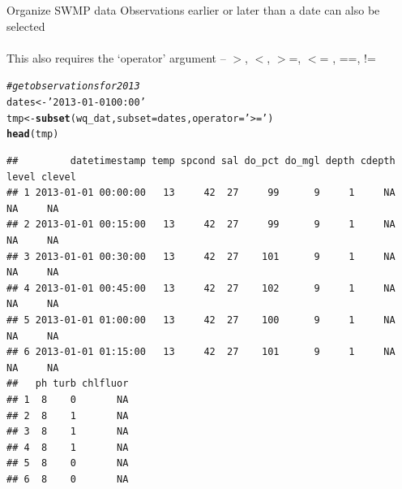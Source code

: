 \documentclass[xcolor=svgnames]{beamer}\usepackage[]{graphicx}\usepackage[]{color}
\makeatletter
\newcommand{\hlstr}[1]{\textcolor[rgb]{0.192,0.494,0.8}{#1}}%
\newcommand{\hlcom}[1]{\textcolor[rgb]{0.678,0.584,0.686}{\textit{#1}}}%
\newcommand{\hlstd}[1]{\textcolor[rgb]{0.345,0.345,0.345}{#1}}%
\newcommand{\hlkwb}[1]{\textcolor[rgb]{0.69,0.353,0.396}{#1}}%
\newcommand{\hlkwc}[1]{\textcolor[rgb]{0.333,0.667,0.333}{#1}}%
\newcommand{\hlkwd}[1]{\textcolor[rgb]{0.737,0.353,0.396}{\textbf{#1}}}%
\newenvironment{kframe}{%
 \def\at@end@of@kframe{}%
 \ifinner\ifhmode%
  \def\at@end@of@kframe{\end{minipage}}%
  \begin{minipage}{\columnwidth}%
 \fi\fi%
 \def\FrameCommand##1{\hskip\@totalleftmargin \hskip-\fboxsep
 \colorbox{shadecolor}{##1}\hskip-\fboxsep
     \hskip-\linewidth \hskip-\@totalleftmargin \hskip\columnwidth}%
 \MakeFramed {\advance\hsize-\width
   \@totalleftmargin\z@ \linewidth\hsize
   \@setminipage}}%
 {\par\unskip\endMakeFramed%
 \at@end@of@kframe}
\newenvironment{knitrout}{}{} %
\makeatother
\begin{document}
\begin{frame}[containsverbatim]{Organize SWMP data}
Observations earlier or later than a date can also be selected \\~\\
This also requires the `operator' argument -- $>$, $<$, $>$=, $<$= , ==, !=
\begin{knitrout}\scriptsize
{}\color{fgcolor}\begin{kframe}
\begin{alltt}
\hlcom{# get observations for 2013}
\hlstd{dates} \hlkwb{<-} \hlstr{'2013-01-01 00:00'}
\hlstd{tmp} \hlkwb{<-} \hlkwd{subset}\hlstd{(wq_dat,} \hlkwc{subset} \hlstd{= dates,} \hlkwc{operator} \hlstd{=} \hlstr{'>='}\hlstd{)}
\hlkwd{head}\hlstd{(tmp)}
\end{alltt}
\begin{verbatim}
##         datetimestamp temp spcond sal do_pct do_mgl depth cdepth level clevel
## 1 2013-01-01 00:00:00   13     42  27     99      9     1     NA    NA     NA
## 2 2013-01-01 00:15:00   13     42  27     99      9     1     NA    NA     NA
## 3 2013-01-01 00:30:00   13     42  27    101      9     1     NA    NA     NA
## 4 2013-01-01 00:45:00   13     42  27    102      9     1     NA    NA     NA
## 5 2013-01-01 01:00:00   13     42  27    100      9     1     NA    NA     NA
## 6 2013-01-01 01:15:00   13     42  27    101      9     1     NA    NA     NA
##   ph turb chlfluor
## 1  8    0       NA
## 2  8    1       NA
## 3  8    1       NA
## 4  8    1       NA
## 5  8    0       NA
## 6  8    0       NA
\end{verbatim}
\end{kframe}
\end{knitrout}
\end{frame}
\end{document}
